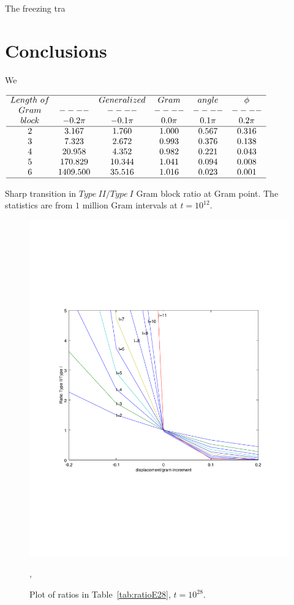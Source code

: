 \documentclass[twoside]{article}
\begin{document}
The freezing tra


\section{\label{conclusions}Conclusions}
We 

\begin{table}
\centering \(\begin{array}{cccccc}
\hline
Length~of  && Generalized &Gram&angle &\phi \\
Gram     &----&----&----&----&----\\
block  & -0.2\pi & -0.1\pi & 0.0\pi & 0.1\pi & 0.2\pi  \\
\hline
2 &3.167 &1.760 &1.000 &0.567 &0.316 \\
3 &7.323 &2.672 &0.993 &0.376 &0.138 \\
4 &20.958 &4.352 &0.982 &0.221 &0.043 \\
5 &170.829 &10.344 &1.041 &0.094 &0.008 \\
6 &1409.500 &35.516 &1.016 &0.023 &0.001 \\
\hline
\end{array}\)
\caption{Sharp transition in $Type~II/Type~I$ Gram block ratio at Gram point.
The statistics are from $1$ million Gram intervals at $t=10^{12}$.}
\label{tab:ratioE12}
\end{table}


\begin{figure}
\centering
\includegraphics[width=1.0\textwidth]{typeIIratio.pdf}
\caption[]{ 
 Plot of  ratios in  Table~\ref{tab:ratioE28},  $t = 10^{28}$.
 }
\vspace{1mm}, 
\label{ratioE28}
\end{figure}
\end{document}
